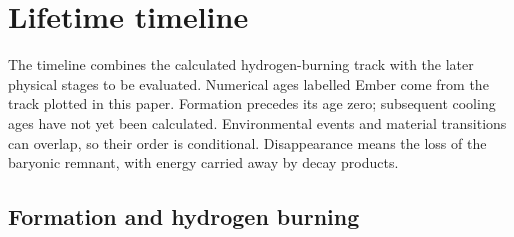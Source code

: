 \clearpage

\section{Lifetime timeline}
\label{sec:lifetime}
The timeline combines the calculated hydrogen-burning track with the later
physical stages to be evaluated. Numerical ages labelled Ember come from the
track plotted in this paper. Formation precedes its age zero; subsequent
cooling ages have not yet been calculated. Environmental events and material
transitions can overlap, so their order is conditional. Disappearance means
the loss of the baryonic remnant, with energy carried away by decay products.

\subsection{Formation and hydrogen burning}
